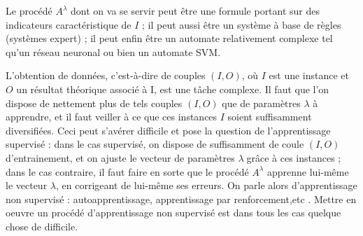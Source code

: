 	Le procédé $A^\lambda$ dont on va se servir peut être une formule portant sur des indicateurs caractéristique de $I$ ; il peut aussi être un système à base de règles (systèmes expert) ; il peut enfin être un automate
	relativement complexe tel qu'un réseau neuronal ou bien un automate SVM.
	
	 L'obtention de données, c'est-à-dire de couples $(I, O)$, où
	$I$ est une instance et $O$ un résultat théorique associé à I, est une tâche complexe. Il faut que l'on dispose de
	nettement plus de tels couples $(I, O)$ que de paramètres $\lambda$ à apprendre, et il faut veiller à
	ce que ces instances $I$ soient suffisamment diversifiées. Ceci peut s'avérer difficile et pose la question de l'apprentissage
	supervisé : dans le cas supervisé, on dispose de suffisamment de coule $(I, O)$
	d'entrainement, et on ajuste le vecteur de paramètres $\lambda$grâce à ces instances ; dans le
	cas contraire, il faut faire en sorte que le procédé $A^\lambda$ apprenne lui-même le vecteur $\lambda$, en
	corrigeant de lui-même ses erreurs. On parle alors d'apprentissage non supervisé : autoapprentissage,
	apprentissage par renforcement,etc . Mettre en oeuvre un procédé
	d'apprentissage non supervisé est dans tous les cas quelque chose de difficile.

 


